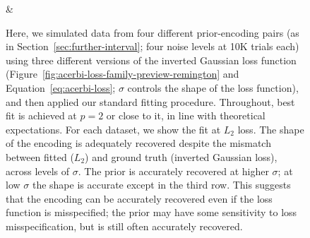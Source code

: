 \begin{figure}[p]
\begin{tabular}
 &
 \\
\end{tabular}
\caption{Here, we simulated data from four different prior-encoding pairs (as in Section~\ref{sec:further-interval}; four noise levels at 10K trials each) using three different versions of the inverted Gaussian loss function (Figure~\ref{fig:acerbi-loss-family-preview-remington} and Equation~\ref{eq:acerbi-loss}; $\sigma$ controls the shape of the loss function), and then applied our standard fitting procedure.
Throughout, best fit is achieved at $p=2$ or close to it, in line with theoretical expectations.
For each dataset, we show the fit at $L_2$ loss.
The shape of the encoding is adequately recovered despite the mismatch between fitted ($L_2$) and ground truth (inverted Gaussian loss), across levels of $\sigma$.
The prior is accurately recovered at higher $\sigma$; at low $\sigma$ the shape is accurate except in the third row.
This suggests that the encoding can be accurately recovered even if the loss function is misspecified; the prior may have some sensitivity to loss misspecification, but is still often accurately recovered.
}
\label{fig:si-alt-acerbi-remington-preview}
\end{figure}

